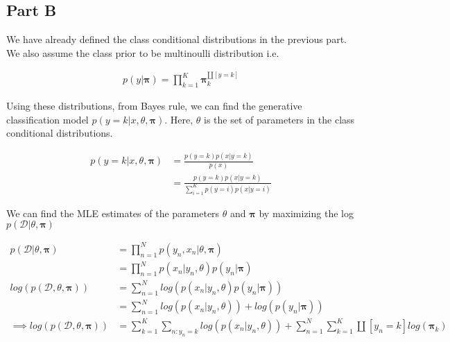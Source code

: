 \documentclass{article}
\begin{document}
\begin{addmargin}{1.5em}
\begin{addmargin}{1.5em}
    \end{addmargin}
    
    \subsection*{Part B}
    \begin{addmargin}{1.5em}
        
        We have already defined the class conditional distributions in the previous part. We also assume the class prior to be multinoulli distribution i.e.
        
        \begin{align*}
            p(y | \boldsymbol{\pi}) = \prod_{k = 1}^{K} \boldsymbol{\pi}_{k}^{\amalg[y = k]}
        \end{align*}
        
        Using these distributions, from Bayes rule, we can find the generative classification model $p(y = k | x, \theta, \boldsymbol{\pi})$. Here, $\theta$ is the set of parameters in the class conditional distributions.
        
        \begin{align*}
            p(y = k | x, \theta, \boldsymbol{\pi}) &= \frac{p(y = k)p(x | y = k)}{p(x)} \\
                                                   &= \frac{p(y = k)p(x | y = k)}{\sum_{i = 1}^{K} p(y = i)p(x | y = i)}
        \end{align*}
        
        We can find the MLE estimates of the parameters $\theta$ and $\boldsymbol{\pi}$ by maximizing the log $p(\mathcal{D} | \theta, \boldsymbol{\pi})$
        
        \begin{align*}
            p(\mathcal{D} | \theta, \boldsymbol{\pi})              &= \prod_{n = 1}^{N} p(y_n, x_n | \theta, \boldsymbol{\pi}) \\
                                                                   &= \prod_{n = 1}^{N} p(x_n | y_n, \theta)p(y_n | \boldsymbol{\pi}) \\
            log(p(\mathcal{D}, \theta, \boldsymbol{\pi}))          &= \sum_{n = 1}^{N} log(p(x_n | y_n, \theta)p(y_n | \boldsymbol{\pi})) \\
                                                                   &= \sum_{n = 1}^{N} log(p(x_n | y_n, \theta)) + log(p(y_n | \boldsymbol{\pi})) \\
            \implies log(p(\mathcal{D}, \theta, \boldsymbol{\pi})) &= \sum_{k = 1}^{K} \sum_{n:y_n = k} log(p(x_n | y_n, \theta)) + \sum_{n = 1}^{N} \sum_{k = 1}^{K} \amalg[y_n = k] log(\boldsymbol{\pi}_k)
        \end{align*}
        

\end{addmargin}
\end{addmargin}
\end{document}
